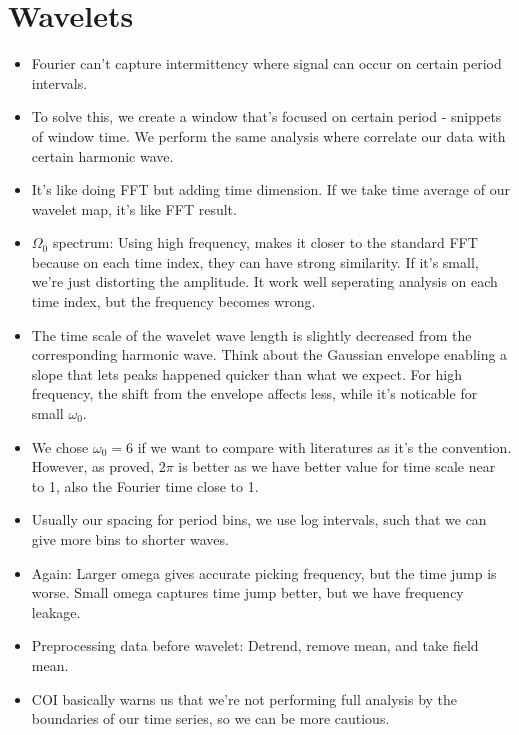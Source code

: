 \documentclass{article}
\begin{document}
\section{Wavelets}
\begin{itemize}
    \item Fourier can't capture intermittency where signal can occur on certain period intervals.
    \item To solve this, we create a window that's focused on certain period - snippets of window time. We perform the same analysis where correlate our data with certain harmonic wave.
    \item It's like doing FFT but adding time dimension. If we take time average of our wavelet map, it's like FFT result.
    \item $\Omega_0$ spectrum: Using high frequency, makes it closer to the standard FFT because on each time index, they can have strong similarity. If it's small, we're just distorting the amplitude. It work well seperating analysis on each time index, but the frequency becomes wrong.
    \item The time scale of the wavelet wave length is slightly decreased from the corresponding harmonic wave. Think about the Gaussian envelope enabling a slope that lets peaks happened quicker than what we expect. For high frequency, the shift from the envelope affects less, while it's noticable for small $\omega_0$.
    \item We chose $\omega_0=6$ if we want to compare with literatures as it's the convention. However, as proved, $2\pi$ is better as we have better value for time scale near to 1, also the Fourier time close to 1.
    \item Usually our spacing for period bins, we use log intervals, such that we can give more bins to shorter waves.
    \item Again: Larger omega gives accurate picking frequency, but the time jump is worse. Small omega captures time jump better, but we have frequency leakage.
    \item Preprocessing data before wavelet: Detrend, remove mean, and take field mean.
    \item COI basically warns us that we're not performing full analysis by the boundaries of our time series, so we can be more cautious.
\end{itemize}
\end{document}
